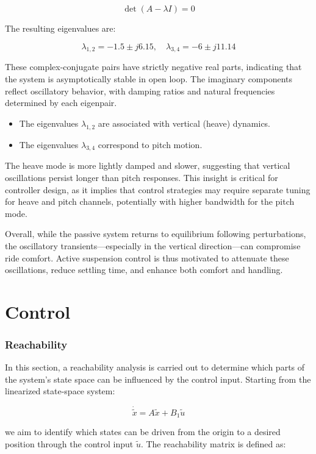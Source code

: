 \documentclass[]{report}
\begin{document}
\[
\det(A - \lambda I) = 0
\]

The resulting eigenvalues are:

\[
\lambda_{1,2} = -1.5 \pm j6.15, \quad \lambda_{3,4} = -6 \pm j11.14
\]

These complex-conjugate pairs have strictly negative real parts, indicating that the system is asymptotically stable in open loop. The imaginary components reflect oscillatory behavior, with damping ratios and natural frequencies determined by each eigenpair.

\begin{itemize}
	\item The eigenvalues \( \lambda_{1,2} \) are associated with vertical (heave) dynamics.
	\item The eigenvalues \( \lambda_{3,4} \) correspond to pitch motion.
\end{itemize}

The heave mode is more lightly damped and slower, suggesting that vertical oscillations persist longer than pitch responses. This insight is critical for controller design, as it implies that control strategies may require separate tuning for heave and pitch channels, potentially with higher bandwidth for the pitch mode.

Overall, while the passive system returns to equilibrium following perturbations, the oscillatory transients—especially in the vertical direction—can compromise ride comfort. Active suspension control is thus motivated to attenuate these oscillations, reduce settling time, and enhance both comfort and handling.



\newpage
\section{Control}

\subsubsection{Reachability}

In this section, a reachability analysis is carried out to determine which parts of the system's state space can be influenced by the control input. Starting from the linearized state-space system:

\[
\dot{\tilde{x}} = A \tilde{x} + B_1 \tilde{u}
\]

we aim to identify which states can be driven from the origin to a desired position through the control input $\tilde{u}$. The reachability matrix is defined as:
\end{document}
